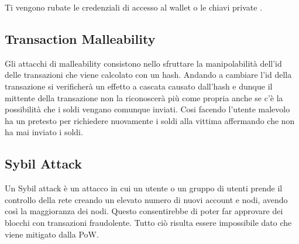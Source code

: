 Ti vengono rubate le credenziali di accesso al wallet o le chiavi private
.

\subsection{Transaction Malleability }

Gli attacchi di malleability consistono nello sfruttare la manipolabilità
dell'id delle transazioni che viene calcolato con un hash. Andando a cambiare
l'id della transazione si verificherà un effetto a cascata causato dall'hash e
dunque il mittente della transazione non la riconoscerà più come propria anche
se c'è la possibilità che i soldi vengano comunque inviati. Cosi facendo
l'utente malevolo ha un pretesto per richiedere nuovamente i soldi alla vittima
affermando che non ha mai inviato i soldi.

\subsection{Sybil Attack}

Un Sybil attack è un attacco in cui un utente o un gruppo di utenti prende il
controllo della rete creando un elevato numero di nuovi account e nodi, avendo
così la maggioranza dei nodi. Questo consentirebbe di poter far approvare dei
blocchi con transazioni fraudolente. Tutto ciò risulta essere impossibile dato
che viene mitigato dalla PoW.